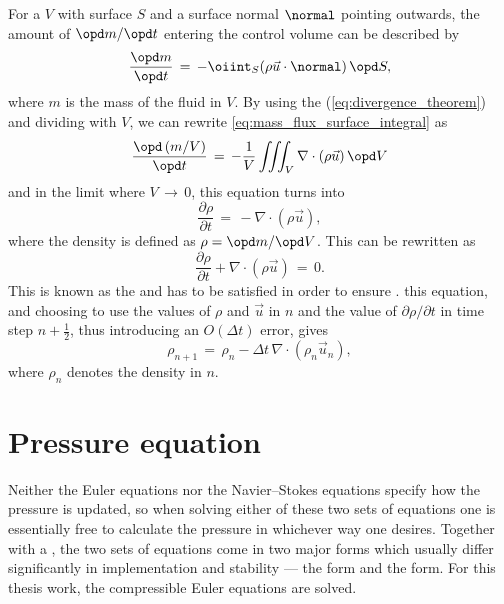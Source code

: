 For a  $V$ with surface $S$ and a surface normal $\normal$ pointing outwards, the amount of  $\opd m/\opd t$ entering the control volume can be described by
%
\begin{equation} \label{eq:mass_flux_surface_integral}
\frac{\opd m}{\opd t} \,=\, -\oiint_S(\rho\vec{u}\cdot\normal)\,\opd S,
\end{equation}
%
where $m$ is the mass of the fluid in $V$. By using the  (\eqref{eq:divergence_theorem}) and dividing with $V$, we can rewrite \eqref{eq:mass_flux_surface_integral} as
%
\begin{equation} \label{eq:mass_flux_volume_integral}
\frac{\opd\,(m/V)}{\opd t} \,=\, -\frac{1}{V}\iiint_V\nabla\cdot(\rho\vec{u})\,\opd V
\end{equation}
%
and in the limit where $V \,\rightarrow\, 0$, this equation turns into
%
\begin{equation} \label{eq:density_partial_time_derivative}
\frac{\partial \rho}{\partial t} \,=\, -\nabla\cdot(\rho\vec{u}),
\end{equation}
%
where the density is defined as $\rho = \opd m/\opd V$. This can be rewritten as
%
\begin{equation} \label{eq:continuity_equation}
\frac{\partial \rho}{\partial t} + \nabla\cdot(\rho\vec{u}) \,=\, 0.
\end{equation}
%
This is known as the  and has to be satisfied in order to ensure .  this equation, and choosing to use the values of $\rho$ and $\vec{u}$ in \timestep $n$ and the value of $\partial \rho/\partial t$ in time step $n+\frac{1}{2}$, thus introducing an $O(\Delta t)$ error, gives
%
\begin{equation} \label{eq:continuity_equation_time_discretized}
\rho_{n+1} \,=\, \rho_{n} - \Delta t\,\nabla\cdot(\rho_{n}\vec{u}_{n}),
\end{equation}
%
where $\rho_n$ denotes the density in \timestep $n$.

\section{Pressure equation}
\label{sec:pressure_calculation}

Neither the Euler equations nor the Navier--Stokes equations specify how the pressure is updated, so when solving either of these two sets of equations one is essentially free to calculate the pressure in whichever way one desires. Together with a , the two sets of equations come in two major forms which usually differ significantly in implementation and stability --- the \compressible form and the \incompressible form. For this thesis work, the compressible Euler equations are solved.

